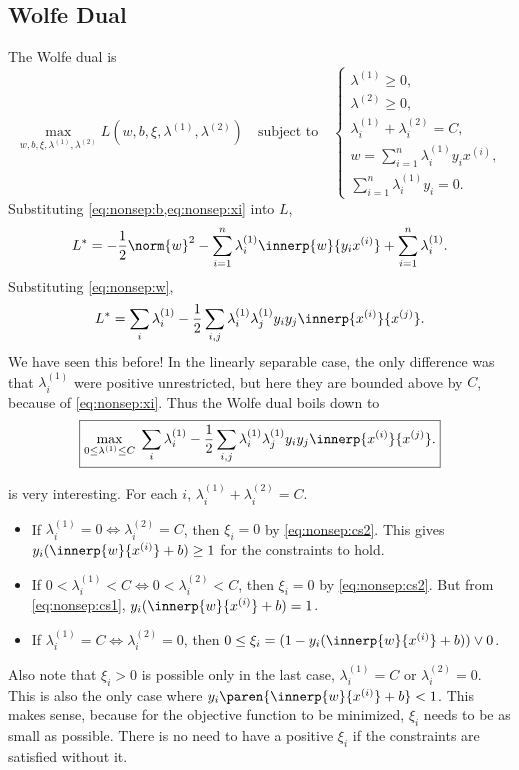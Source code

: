 \subsection{Wolfe Dual} \label{sec:svm:nonsep:wolfe}
The Wolfe dual is \[
    \max_{w, b, \xi, \lambda^{(1)}, \lambda^{(2)}}
        L(w, b, \xi, \lambda^{(1)}, \lambda^{(2)})
    \quad\text{subject to}\quad
    \begin{cases}
        \lambda^{(1)} \ge 0, \\
        \lambda^{(2)} \ge 0, \\
        \lambda^{(1)}_i + \lambda^{(2)}_i = C, \\
        w = \sum_{i=1}^n \lambda^{(1)}_i y_i x^{(i)}, \\
        \sum_{i=1}^n \lambda^{(1)}_i y_i = 0.
    \end{cases}
\]
Substituting \cref{eq:nonsep:b,eq:nonsep:xi} into $L$, \[
    L^* = -\frac12 \norm{w}^2 - \sum_{i=1}^n \lambda^{(1)}_i
        \innerp{w}{y_i x^{(i)}} + \sum_{i=1}^n \lambda^{(1)}_i.
\] Substituting \cref{eq:nonsep:w}, \[
    L^* = \sum_i \lambda^{(1)}_i
            -\frac12 \sum_{i,j} \lambda^{(1)}_i \lambda^{(1)}_j y_i y_j
                                        \innerp{x^{(i)}}{x^{(j)}}.
\] We have seen this before!
In the linearly separable case, the only difference was that
$\lambda^{(1)}_i$ were positive unrestricted, but here they are bounded
above by $C$, because of \cref{eq:nonsep:xi}.
Thus the Wolfe dual boils down to \[
    \boxed{
        \max_{0 \le \lambda^{(1)} \le C}\; \sum_i \lambda^{(1)}_i
            -\frac12 \sum_{i,j} \lambda^{(1)}_i \lambda^{(1)}_j y_i y_j
            \innerp{x^{(i)}}{x^{(j)}}.
    }
\]

 is very interesting.
For each $i$, $\lambda^{(1)}_i + \lambda^{(2)}_i = C$.
\begin{itemize}
    \item If $\lambda^{(1)}_i = 0 \iff \lambda^{(2)}_i = C$,
    then $\xi_i = 0$ by \cref{eq:nonsep:cs2}.
    This gives $y_i (\innerp{w}{x^{(i)}} + b) \ge 1$ for the constraints
    to hold.
    \item If $0 < \lambda^{(1)}_i < C \iff 0 < \lambda^{(2)}_i < C$,
    then $\xi_i = 0$ by \cref{eq:nonsep:cs2}.
    But from \cref{eq:nonsep:cs1}, $y_i (\innerp{w}{x^{(i)}} + b) = 1$.
    \item If $\lambda^{(1)}_i = C \iff \lambda^{(2)}_i = 0$,
    then $0 \le \xi_i = (1 - y_i (\innerp{w}{x^{(i)}} + b)) \vee 0$.
\end{itemize}
Also note that $\xi_i > 0$ is possible only in the last case,
$\lambda^{(1)}_i = C$ or $\lambda^{(2)}_i = 0$.
This is also the only case where $y_i \paren{\innerp{w}{x^{(i)}} + b} < 1$.
This makes sense, because for the objective function to be minimized,
$\xi_i$ needs to be as small as possible.
There is no need to have a positive $\xi_i$ if the constraints are satisfied
without it.

